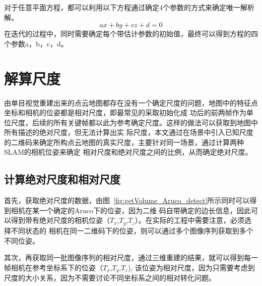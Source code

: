 对于任意平面方程，都可以利用以下方程通过确定4个参数的方式来确定唯一解析解。
\begin{equation}ax+by+cz+d= 0\end{equation}
在迭代的过程中，同时需要确定每个带估计参数的初始值，最终可以得到方程的四个参数a，b，c，d。

\section{解算尺度}
\label{sec:4.3}
由单目视觉重建出来的点云地图都存在没有一个确定尺度的问题，地图中的特征点坐标和相机的位姿都是相对尺度，即最常见的采取初始化成
功后的前两帧作为单位尺度，后续的所有关键帧都以此为参考确定尺度。这样的做法可以获取到地图中所有描述的绝对尺度，但无法计算出实
际尺度，本文通过在场景中引入已知尺度的二维码来确定所构点云地图的真实尺度，主要针对同一场景，通过计算两种SLAM的相机位姿来确定
相对尺度和绝对尺度之间的比例，从而确定绝对尺度。
\subsection{计算绝对尺度和相对尺度}
首先，获取绝对尺度的数据，由图~\ref{fig:getVolume_Aruco_detect}所示同时可以得到相机在某一个确定的Aruco下的位姿，因为二维
码自带确定的边长信息，因此可以得到带有绝对尺度的相机位姿（$T_x$,$T_y$,$T_z$）。在实际的工程中需要注意，必须选择不同状态的
相机在同一二维码下的位姿，则可以通过多个图像序列获取到多个不同位姿。

其次，再获取同一批图像序列的相对尺度，通过三维重建的结果，就可以得到每一帧相机在参考坐标系下的位姿（$T_x$,$T_y$,$T_z$),
该位姿为相对尺度，因为只需要考虑到尺度的大小关系，因为不需要讨论不同坐标系之间的相对转化问题。
